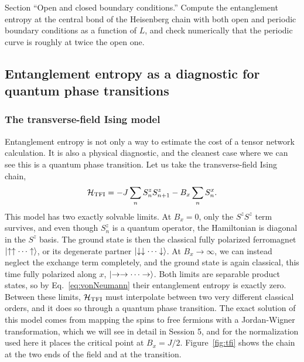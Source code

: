 \documentclass[lecture_notes.tex]{subfiles}
\begin{document}
\begin{notebook}
Section ``Open and closed boundary conditions.'' Compute the entanglement entropy at the central
bond of the Heisenberg chain with both open and periodic boundary conditions as a function of $L$,
and check numerically that the periodic curve is roughly at twice the open one.
\end{notebook}

\subsection{Entanglement entropy as a diagnostic for quantum phase transitions}

\subsubsection{The transverse-field Ising model}
\label{sec:tfi}
Entanglement entropy is not only a way to estimate the cost of a tensor network calculation. It is
also a physical diagnostic, and the cleanest case where we can see this is a quantum phase
transition. Let us take the transverse-field Ising chain,
\begin{equation}
  \mathcal{H}_{\mathrm{TFI}} = -J\sum_n S_n^z S_{n+1}^z - B_x \sum_n S_n^x.
  \label{eq:tfi}
\end{equation}
This model has two exactly solvable limits. At $B_x=0$, only the $S^zS^z$ term survives, and even
though $S^z_n$ is a quantum operator, the Hamiltonian is diagonal in the $S^z$ basis. The ground
state is then the classical fully polarized ferromagnet $\ket{\uparrow\uparrow\cdots\uparrow}$, or its degenerate
partner $\ket{\downarrow\downarrow\cdots\downarrow}$. At $B_x\to\infty$, we can instead neglect the exchange term
completely, and the ground state is again classical, this time fully polarized along $x$,
$\ket{\to\to\cdots\to}$. Both limits are separable product states, so by
Eq.~\eqref{eq:vonNeumann} their entanglement entropy is exactly zero. Between these limits,
$\mathcal{H}_{\mathrm{TFI}}$ must interpolate between two very different classical orders, and it does so
through a quantum phase transition. The exact solution of this model comes from mapping the spins
to free fermions with a Jordan-Wigner transformation, which we will see in detail in Session 5, and
for the normalization used here it places the critical point at $B_x = J/2$. Figure~\ref{fig:tfi}
shows the chain at the two ends of the field and at the transition.
\end{document}

